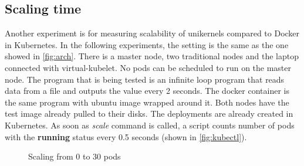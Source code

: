 \subsection{Scaling time}
Another experiment is for measuring scalability of unikernels compared to Docker in Kubernetes. In the following experiments, the setting is the same as the one showed in \ref{fig:arch}. There is a master node, two traditional nodes and the laptop connected with virtual-kubelet. No pods can be scheduled to run on the master node. The program that is being tested is an infinite loop program that reads data from a file and outputs the value every 2 seconds. The docker container is the same program with ubuntu image wrapped around it. Both nodes have the test image already pulled to their disks. The deployments are already created in Kubernetes. As soon as \textit{scale} command is called, a script counts number of pods with the \textbf{running} status every 0.5 seconds (shown in \ref{fig:kubectl}).

\begin{figure}[htpb]
  \centering
  \caption{Scaling from 0 to 30 pods}\label{fig:scale-up-30}
  \end{figure}

